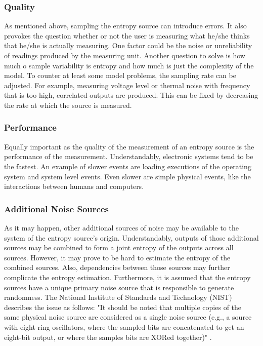 \subsubsection{Quality}
As mentioned above, sampling the entropy source can introduce errors. It also provokes the question whether or not the user is measuring what he/she thinks that he/she is actually measuring.
One factor could be the noise or unreliability of readings produced by the measuring unit. Another question to solve is how much o sample variability is entropy and how much is just the complexity of the model.
\newline
To counter at least some model problems, the sampling rate can be adjusted. For example, measuring voltage level or thermal noise with frequency that is too high, correlated outputs are produced.
This can be fixed by decreasing the rate at which the source is measured.

\subsubsection{Performance}
Equally important as the quality of the measurement of an entropy source is the performance of the measurement. Understandably, electronic systems tend to be the fastest. An example of slower events are loading executions of the operating system and system level events.
Even slower are simple physical events, like the interactions between humans and computers.

\subsubsection{Additional Noise Sources}
As it may happen, other additional sources of noise may be available to the system of the entropy source's origin.
Understandably, outputs of those additional sources may be combined to form a joint entropy of the outputs across all sources.
However, it may prove to be hard to estimate the entropy of the combined sources. Also, dependencies between those sources may further complicate the entropy estimation.
\newline
Furthermore, it is assumed that the entropy sources have a unique primary noise source that is responsible to generate randomness. 
The National Institute of Standards and Technology (NIST) describes the issue as follows: "It should be noted that multiple copies of the same physical noise source are considered as a single noise source (e.g., a source with eight ring
oscillators, where the sampled bits are concatenated to get an eight-bit output, or where the samples bits are XORed together)" \cite{randomness:sources1}.

